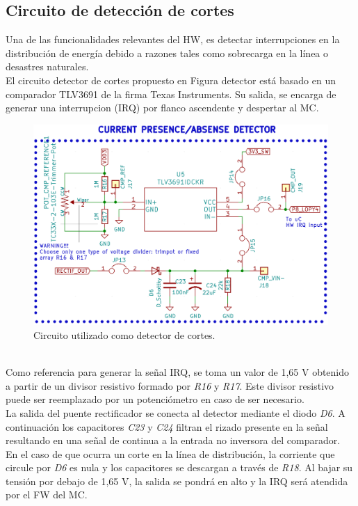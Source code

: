  \subsection{Circuito de detección de cortes}
 Una de las funcionalidades relevantes del HW, es detectar interrupciones en la distribución de energía debido a razones tales como sobrecarga en la línea o desastres naturales.\\
 El circuito detector de cortes propuesto en Figura detector está basado en un comparador TLV3691 de la firma Texas Instruments. Su salida, se encarga de generar una interrupcion (IRQ) por flanco ascendente y despertar al MC.\\
 \begin{figure}[h]
 	\centering
 	\includegraphics[width=0.7\linewidth]{Figures/cto_detector_cortes}
 	\caption{Circuito utilizado como detector de cortes.}
 	\label{fig:ctodetectorcortes}
 \end{figure}\\
 Como referencia para generar la señal IRQ, se toma un valor de 1,65 V obtenido a partir de un divisor resistivo formado por \textit{R16} y \textit{R17}. Este divisor resistivo puede ser reemplazado por un potenciómetro en caso de ser necesario.\\
 La salida del puente rectificador se conecta al detector mediante el diodo \textit{D6}. A continuación los capacitores \textit{C23} y \textit{C24} filtran el rizado presente en la señal resultando en una señal de continua a la entrada no inversora del comparador.\\
 En el caso de que ocurra un corte en la línea de distribución, la corriente que circule por \textit{D6} es nula y los capacitores se descargan a través de \textit{R18}. Al bajar su tensión por debajo de 1,65 V, la salida se pondrá en alto y la IRQ será atendida por el FW del MC.\\
 
